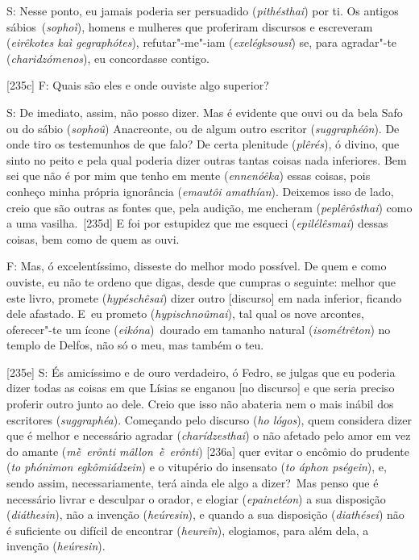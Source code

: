  

S: Nesse ponto, eu jamais poderia ser persuadido (\emph{pithésthai}) por
ti. Os antigos sábios~(\emph{sophoì}), homens e mulheres que proferiram
discursos e escreveram (\emph{eirêkotes kaì gegraphótes}),
refutar"-me"-iam (\emph{exelégksousí}) se, para agradar"-te
(\emph{charidzómenos}), eu concordasse contigo.

 

[235c] F: Quais são eles e onde ouviste algo superior?

 

S: De imediato, assim, não posso dizer. Mas é evidente que ouvi ou da
bela Safo ou do sábio (\emph{sophoû}) Anacreonte, ou de algum outro
escritor (\emph{suggraphéôn}). De onde tiro os testemunhos de que falo?
De certa plenitude (\emph{plêrés}), ó divino, que sinto no peito e pela
qual poderia dizer outras tantas coisas nada inferiores. Bem sei que não
é por mim que tenho em mente (\emph{ennenóêka}) essas coisas, pois
conheço minha própria ignorância (\emph{emautôi amathían}). Deixemos
isso de lado, creio que são outras as fontes que, pela audição, me
encheram (\emph{peplêrôsthai}) como a uma vasilha.~[235d] E foi por
estupidez que me esqueci (\emph{epilélêsmai}) dessas coisas, bem como de
quem as ouvi.

 

F: Mas, ó excelentíssimo, disseste do melhor modo possível. De quem e
como ouviste, eu não te ordeno que digas, desde que cumpras o seguinte:
melhor que este livro, promete (\emph{hypéschêsai}) dizer outro
[discurso] em nada inferior, ficando dele afastado. E~eu prometo
(\emph{hypischnoûmai}), tal qual os nove arcontes, oferecer"-te um ícone
(\emph{eikóna})~dourado em tamanho natural (\emph{isométrêton}) no
templo de Delfos, não só o meu, mas também o teu.

 

[235e] S: És amicíssimo e de ouro verdadeiro, ó Fedro, se julgas que
eu poderia dizer todas as coisas em que Lísias se enganou [no
discurso] e que seria preciso proferir outro junto ao dele. Creio que
isso não abateria nem o mais inábil dos escritores (\emph{suggraphéa}).
Começando pelo discurso (\emph{ho lógos}), quem considera dizer que é
melhor e necessário agradar (\emph{charídzesthai}) o não afetado pelo
amor em vez do amante (\emph{mḕ~erônti mâllon~ḕ~erônti}) [236a] quer
evitar o encômio do prudente (\emph{to phónimon egkômiádzein}) e o
vitupério do insensato (\emph{to áphon pségein}), e, sendo assim,
necessariamente, terá ainda ele algo a dizer?~Mas penso que é necessário
livrar e desculpar o orador, e elogiar (\emph{epainetéon}) a sua
disposição (\emph{diáthesin}), não a invenção (\emph{heúresin}), e
quando a sua disposição (\emph{diathései}) não é suficiente ou difícil
de encontrar (\emph{heureîn}), elogiamos, para além dela, a invenção
(\emph{heúresin}).


